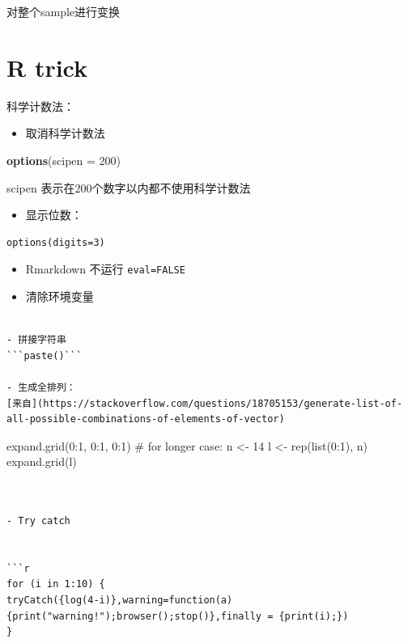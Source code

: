 \documentclass[
]{book}
\newenvironment{Shaded}{\begin{snugshade}}{\end{snugshade}}
\newcommand{\DataTypeTok}[1]{\textcolor[rgb]{0.13,0.29,0.53}{#1}}
\newcommand{\DecValTok}[1]{\textcolor[rgb]{0.00,0.00,0.81}{#1}}
\newcommand{\KeywordTok}[1]{\textcolor[rgb]{0.13,0.29,0.53}{\textbf{#1}}}
\newcommand{\NormalTok}[1]{#1}
\providecommand{\tightlist}{%
  \setlength{\itemsep}{0pt}\setlength{\parskip}{0pt}}
\theoremstyle{definition}
\theoremstyle{definition}
\theoremstyle{definition}
\theoremstyle{remark}
\begin{document}
对整个sample进行变换

\hypertarget{r-trick}{%
\chapter{R trick}\label{r-trick}}

科学计数法：

\begin{itemize}
\tightlist
\item
  取消科学计数法
\end{itemize}

\begin{Shaded}
\begin{Highlighting}[]
\KeywordTok{options}\NormalTok{(}\DataTypeTok{scipen =} \DecValTok{200}\NormalTok{)}
\end{Highlighting}
\end{Shaded}

scipen 表示在200个数字以内都不使用科学计数法

\begin{itemize}
\tightlist
\item
  显示位数：
\end{itemize}

\begin{verbatim}
options(digits=3)
\end{verbatim}

\begin{itemize}
\item
  Rmarkdown 不运行
  \texttt{eval=FALSE}
\item
  清除环境变量
\end{itemize}

\begin{verbatim}

- 拼接字符串
```paste()```

- 生成全排列：
[来自](https://stackoverflow.com/questions/18705153/generate-list-of-all-possible-combinations-of-elements-of-vector)
\end{verbatim}

expand.grid(0:1, 0:1, 0:1)
\# for longer case:
n \textless- 14
l \textless- rep(list(0:1), n)
expand.grid(l)

\begin{verbatim}


- Try catch


```r
for (i in 1:10) {
tryCatch({log(4-i)},warning=function(a){print("warning!");browser();stop()},finally = {print(i);})
}
\end{verbatim}
\end{document}
